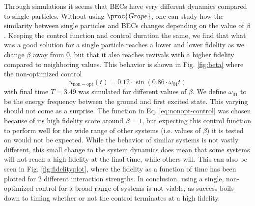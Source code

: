 \documentclass[a4paper, twocolumn]{revtex4-1}
\begin{document}
Through simulations it seems that BECs have very different dynamics compared to single particles. Without using $\proc{Grape}$, one can study how the similarity between single particles and BECs changes depending on the value of $\beta$. Keeping the control function and control duration the same, we find that what was a good solution for a single particle reaches a lower and lower fidelity as we change $\beta$ away from 0, but that it also reaches revivals with a higher fidelity compared to neighboring values. This behavior is shown in Fig. \ref{fig:beta} where the non-optimized control
\begin{equation}
	u_{\mathrm{non-opt}}(t)=0.12\cdot\sin(0.86\cdot \omega_{01} t)
	\label{eq:nonopt-control}
\end{equation} with final time $T=3.49$ was simulated for different values of $\beta$. We define $\omega_{01}$ to be the energy frequency between the ground and first excited state. This varying should not come as a surprise. The function in Eq. \eqref{eq:nonopt-control} was chosen because of its high fidelity score around $\beta=1$, but expecting this control function to perform well for the wide range of other systems (i.e. values of $\beta$) it is tested on would not be expected. While the behavior of similar systems is not vastly different, this small change to the system dynamics does mean that some systems will not reach a high fidelity at the final time, while others will. This can also be seen in Fig. \ref{fig:fidelityplot}, where the fidelity as a function of time has been plotted for 2 different interaction strengths. 
In conclusion, using a single, non-optimized control for a broad range of systems is not viable, as success boils down to timing whether or not the control terminates at a high fidelity.
\end{document}
